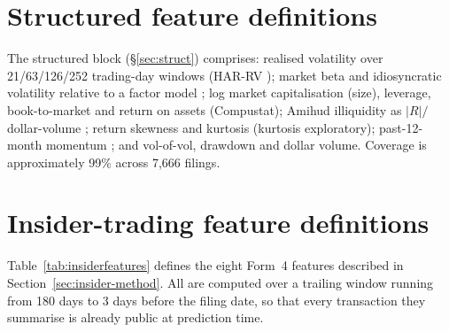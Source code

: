 \documentclass[logo,msc,ai]{infthesis}        %
\begin{document}
\chapter{Structured feature definitions}
\label{app:features}
The structured block (\S\ref{sec:struct}) comprises: realised volatility over 21/63/126/252 trading-day windows (HAR-RV \cite{corsi2009simple}); market beta and idiosyncratic volatility relative to a factor model \cite{ang2006cross}; log market capitalisation (size), leverage, book-to-market \cite{fama1992cross,ang2006cross} and return on assets (Compustat); Amihud illiquidity as $|R|/$dollar-volume \cite{amihud2002illiquidity}; return skewness and kurtosis \cite{conrad2013ex} (kurtosis exploratory); past-12-month momentum \cite{ang2006cross}; and vol-of-vol, drawdown and dollar volume. Coverage is approximately 99\% across 7{,}666 filings.

\chapter{Insider-trading feature definitions}
\label{app:insider-features}
Table~\ref{tab:insiderfeatures} defines the eight Form~4 features described in Section~\ref{sec:insider-method}. All are computed over a trailing window running from 180 days to 3 days before the filing date, so that every transaction they summarise is already public at prediction time.
\end{document}
